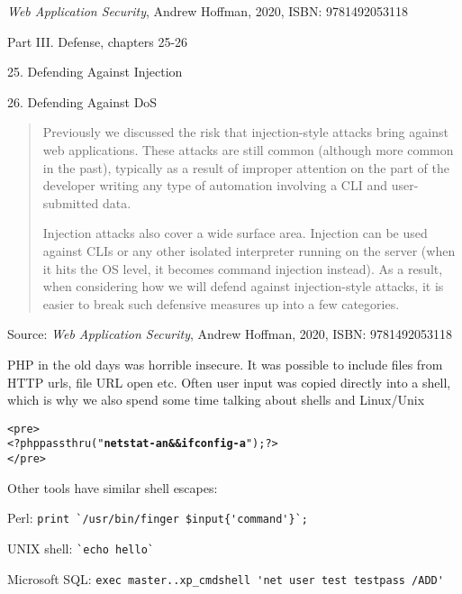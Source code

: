 \documentclass[Screen16to9,17pt]{foils}
\begin{document}
\emph{Web Application Security}, Andrew Hoffman, 2020, ISBN: 9781492053118

\begin{list1}
\item Part III. Defense, chapters 25-26
\item 25. Defending Against Injection
\item 26. Defending Against DoS

\end{list1}





\begin{quote}
Previously we discussed the risk that injection-style attacks bring against web applications. These attacks are still common (although more common in the past), typically as a result of improper attention on the part of the developer writing any type of automation involving a CLI and user-submitted data.

Injection attacks also cover a wide surface area. Injection can be used against CLIs or any other isolated interpreter running on the server (when it hits the OS level, it becomes command injection instead). As a result, when considering how we will defend against injection-style attacks, it is easier to break such defensive measures up into a few categories.
\end{quote}

Source: \emph{Web Application Security}, Andrew Hoffman, 2020, ISBN: 9781492053118


\begin{list1}
\item PHP in the old days was horrible insecure. It was possible to include files from HTTP urls, file URL open etc. Often user input was copied directly into a shell, which is why we also spend some time talking about shells and Linux/Unix
\end{list1}
\begin{alltt}
<pre>
<?php passthru("{\bf netstat -an && ifconfig -a}"); ?>
</pre>
\end{alltt}
\begin{list1}
\item Other tools have similar shell escapes:
\begin{list2}
\item Perl: \verb+print `/usr/bin/finger $input{'command'}`;+
\item UNIX shell: \verb+`echo hello`+
\item Microsoft SQL: \verb+exec master..xp_cmdshell 'net user test testpass /ADD'+
\end{list2}
\end{list1}
\end{document}
